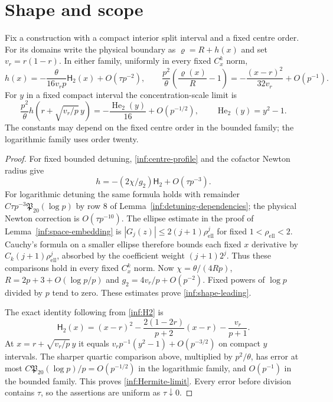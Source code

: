 \section{Shape and scope}\label{inf:sec-shape}

\begin{proposition}\label{inf:shape}
Fix a construction with a compact interior split interval and a fixed
centre order. For its domains
write the physical boundary as $\varrho=R+h(x)$ and set
$v_r=r(1-r)$. In either family, uniformly in every fixed $C_x^k$ norm,
\begin{equation}\label{inf:shape-leading}
 h(x)=-\frac{\theta}{16v_rp}\mathsf H_2(x)+O(\tau p^{-2}),
 \qquad
 \frac{p^2}{\theta}\left(\frac{\varrho(x)}R-1\right)
 =-\frac{(x-r)^2}{32v_r}+O(p^{-1}).
\end{equation}
For $y$ in a fixed compact interval the concentration-scale limit is
\begin{equation}\label{inf:Hermite-limit}
 \frac{p^2}{\theta}h(r+\sqrt{v_r/p}\,y)
 =-\frac{\operatorname{He}_2(y)}{16}+O(p^{-1/2}),
 \qquad \operatorname{He}_2(y)=y^2-1.
\end{equation}
The constants may depend on the fixed centre order in the bounded
family; the logarithmic family uses order twenty.
\end{proposition}
\begin{proof}
For fixed bounded detuning, \eqref{inf:centre-profile} and the
cofactor Newton radius give
\[
 h=-(2\chi/g_2)\mathsf H_2+O(\tau p^{-3}).
\]
For logarithmic detuning the same formula holds with remainder
$C\tau p^{-3}\mathfrak P_{20}(\log p)$ by row 8 of
Lemma~\ref{inf:detuning-dependencies}; the physical Newton correction
is $O(\tau p^{-10})$.
The ellipse estimate in the proof of Lemma~\ref{inf:space-embedding}
is $|G_j(z)|\le2(j+1)\rho_{\mathrm{ell}}^j$ for fixed
$1<\rho_{\mathrm{ell}}<2$. Cauchy's formula on a smaller ellipse
therefore bounds each fixed $x$ derivative by
$C_k(j+1)\rho_{\mathrm{ell}}^j$, absorbed by the coefficient
weight $(j+1)2^j$. Thus these comparisons hold in every fixed
$C_x^k$ norm.
Now $\chi=\theta/(4Rp)$, $R=2p+3+O(\log p/p)$ and
$g_2=4v_r/p+O(p^{-2})$.
Fixed powers of $\log p$ divided by $p$ tend to zero.
These estimates prove \eqref{inf:shape-leading}.

The exact identity following from \eqref{inf:H2} is
\[
 \mathsf H_2(x)=(x-r)^2-
 \frac{2(1-2r)}{p+2}(x-r)-\frac{v_r}{p+1}.
\]
At $x=r+\sqrt{v_r/p}\,y$ it equals
$v_rp^{-1}(y^2-1)+O(p^{-3/2})$ on compact $y$ intervals.
The sharper quartic comparison above, multiplied by $p^2/\theta$,
has error at most $C\mathfrak P_{20}(\log p)/p=O(p^{-1/2})$ in
the logarithmic family, and $O(p^{-1})$ in the bounded family.
This proves \eqref{inf:Hermite-limit}. Every error before division
contains $\tau$, so the assertions are uniform as $\tau\downarrow0$.
\end{proof}

